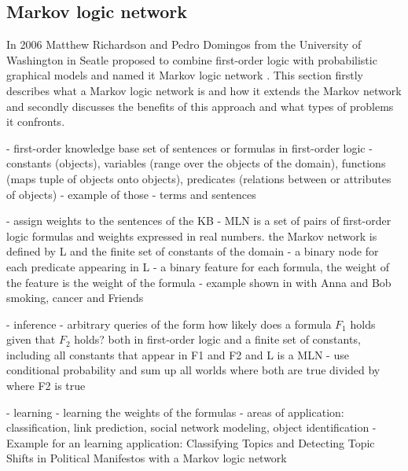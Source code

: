 



\subsection{Markov logic network} \label{sec:mln}

In 2006 Matthew Richardson and Pedro Domingos from the University of Washington in Seatle proposed to combine first-order logic with probabilistic graphical models and named it Markov logic network \cite{richardson2006markov}. This section firstly describes what a Markov logic network is and how it extends the Markov network and secondly discusses the benefits of this approach and what types of problems it confronts.

- first-order knowledge base set of sentences or formulas in first-order logic
- constants (objects), variables (range over the objects of the domain), functions (maps tuple of objects onto objects), predicates (relations between or attributes of objects)
- example of those
- terms and sentences

- assign weights to the sentences of the KB
- MLN is a set of pairs of first-order logic formulas and weights expressed in real numbers. the Markov network is defined by L and the finite set of constants of the domain 
 - a binary node for each predicate appearing in L
 - a binary feature for each formula, the weight of the feature is the weight of the formula
- example shown in \cite{richardson2006markov} with Anna and Bob smoking, cancer and Friends

- inference
 - arbitrary queries of the form how likely does a formula $F_1$ holds given that $F_2$ holds? both in first-order logic and a finite set of constants, including all constants that appear in F1 and F2 \cite{richardson2006markov} and L is a MLN
  - use conditional probability and sum up all worlds where both are true divided by where F2 is true
  
- learning
 - learning the weights of the formulas
 - areas of application: classification, link prediction, social network modeling, object identification
 - Example for an learning application: Classifying Topics and Detecting Topic Shifts in Political Manifestos with a Markov logic network \cite{zirn2016classifying}


